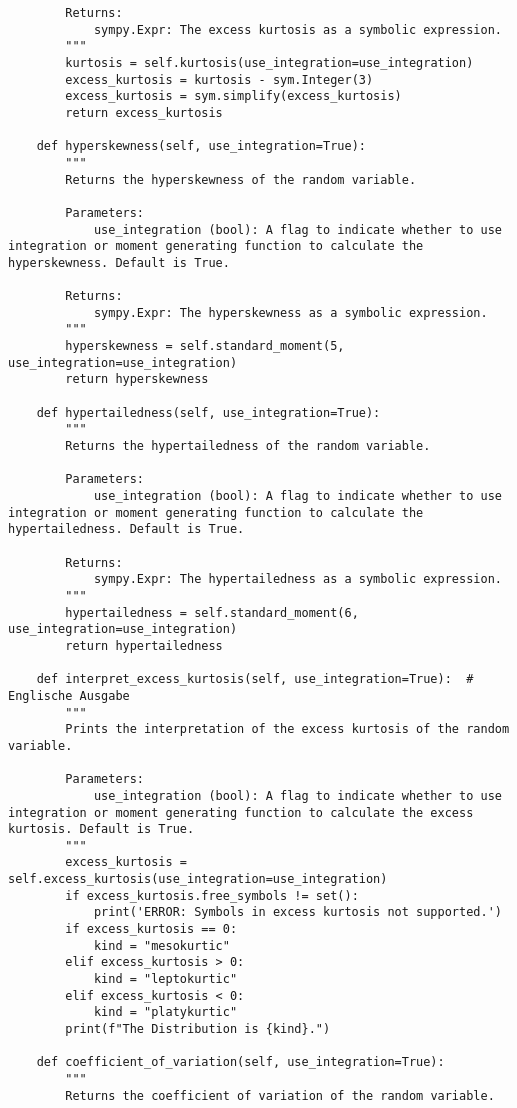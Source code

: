 \begin{small}
\begin{lstlisting}
        Returns:
            sympy.Expr: The excess kurtosis as a symbolic expression.
        """
        kurtosis = self.kurtosis(use_integration=use_integration)
        excess_kurtosis = kurtosis - sym.Integer(3)
        excess_kurtosis = sym.simplify(excess_kurtosis)
        return excess_kurtosis

    def hyperskewness(self, use_integration=True):
        """
        Returns the hyperskewness of the random variable.

        Parameters:
            use_integration (bool): A flag to indicate whether to use integration or moment generating function to calculate the hyperskewness. Default is True.

        Returns:
            sympy.Expr: The hyperskewness as a symbolic expression.
        """
        hyperskewness = self.standard_moment(5, use_integration=use_integration)
        return hyperskewness

    def hypertailedness(self, use_integration=True):
        """
        Returns the hypertailedness of the random variable.

        Parameters:
            use_integration (bool): A flag to indicate whether to use integration or moment generating function to calculate the hypertailedness. Default is True.

        Returns:
            sympy.Expr: The hypertailedness as a symbolic expression.
        """
        hypertailedness = self.standard_moment(6, use_integration=use_integration)
        return hypertailedness

    def interpret_excess_kurtosis(self, use_integration=True):  # Englische Ausgabe
        """
        Prints the interpretation of the excess kurtosis of the random variable.

        Parameters:
            use_integration (bool): A flag to indicate whether to use integration or moment generating function to calculate the excess kurtosis. Default is True.
        """
        excess_kurtosis = self.excess_kurtosis(use_integration=use_integration)
        if excess_kurtosis.free_symbols != set():
            print('ERROR: Symbols in excess kurtosis not supported.')
        if excess_kurtosis == 0:
            kind = "mesokurtic"
        elif excess_kurtosis > 0:
            kind = "leptokurtic"
        elif excess_kurtosis < 0:
            kind = "platykurtic"
        print(f"The Distribution is {kind}.")

    def coefficient_of_variation(self, use_integration=True):
        """
        Returns the coefficient of variation of the random variable.


\end{lstlisting}
\end{small}

